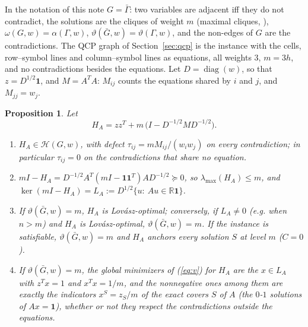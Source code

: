 \documentclass[11pt]{article}
\newtheorem{prop}[thm]{Proposition}
\theoremstyle{definition}
\theoremstyle{remark}
\newcommand{\R}{\mathbb{R}}
\newcommand{\Hc}{\mathcal{H}}
\newcommand{\one}{\mathbf{1}}
\newcommand{\lmax}{\lambda_{\max}}
\newcommand{\vt}{\vartheta(\bar G,w)}
\newcommand{\om}{\omega(G,w)}
\begin{document}
In the notation of this note $G=\bar\Gamma$: two variables are adjacent iff
they do not contradict, the solutions are the cliques of weight $m$ (maximal
cliques, \cite[Claim~1]{Bu07}), $\om=\alpha(\Gamma,w)$,
$\vt=\vartheta(\Gamma,w)$, and the non-edges of $G$ are the contradictions.
The QCP graph of Section~\ref{sec:qcp} is the instance with the cells,
row--symbol lines and column--symbol lines as equations, all weights $3$,
$m=3h$, and no contradictions besides the equations. Let
$D=\operatorname{diag}(w)$, so that $z=D^{1/2}\one$, and $M=A^TA$: $M_{ij}$
counts the equations shared by $i$ and $j$, and $M_{jj}=w_j$.

\begin{prop}
\label{prop:sat01}
Let
\[ H_A = zz^T + m\,\bigl(I - D^{-1/2}MD^{-1/2}\bigr). \]
\begin{enumerate}
\item[(a)] $H_A\in\Hc(G,w)$, with defect $\tau_{ij}=mM_{ij}/(w_iw_j)$ on
every contradiction; in particular $\tau_{ij}=0$ on the contradictions that
share no equation.
\item[(b)] $mI-H_A=D^{-1/2}A^T(mI-\one\one^T)AD^{-1/2}\succeq0$, so
$\lmax(H_A)\leq m$, and $\ker(mI-H_A)=L_A:=D^{1/2}\{u:\ Au\in\R\one\}$.
\item[(c)] If $\vt=m$, $H_A$ is Lov\'asz-optimal; conversely, if $L_A\neq0$
(e.g. when $n>m$) and $H_A$ is Lov\'asz-optimal, $\vt=m$. If the instance is
satisfiable, $\vt=m$ and $H_A$ anchors every solution $S$ at level $m$
($C=0$).
\item[(d)] If $\vt=m$, the global minimizers of (\ref{eq:v}) for $H_A$ are
the $x\in L_A$ with $z^Tx=1$ and $x^Tx=1/m$, and the nonnegative ones among
them are exactly the indicators $x^S=z_S/m$ of the exact covers $S$ of $A$
(the $0$-$1$ solutions of $Ax=\one$), whether or not they respect the
contradictions outside the equations.
\end{enumerate}
\end{prop}
\end{document}
